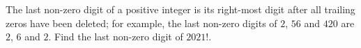 The last non-zero digit of a positive integer is its right-most digit after all trailing zeros have been deleted; for example, the last non-zero digits of $2$, $56$ and $420$ are $2$, $6$ and $2$. Find the last non-zero digit of $2021!$.
